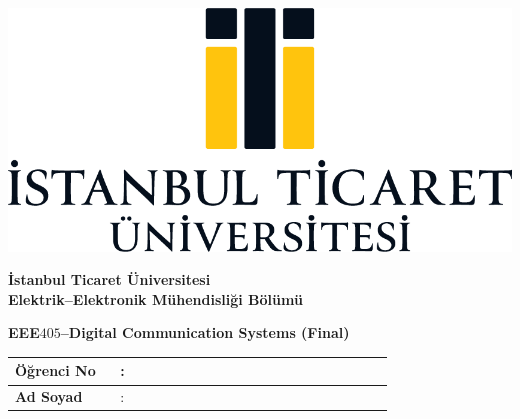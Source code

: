 \documentclass[a4paper, 11pt]{article}
\begin{document}
	\boldmath
	\thispagestyle{empty}
	\begin{minipage}[c]{\textwidth}
		\begin{minipage}[c]{0.3\textwidth}
			\centering
			\includegraphics[width=\textwidth]{logo.png}
		\end{minipage}%
		\begin{minipage}[c]{0.7\textwidth}
			\centering
			{\LARGE \textbf{İstanbul Ticaret Üniversitesi}}\\[1em]
			{\Large \textbf{Elektrik--Elektronik Mühendisliği Bölümü}}
		\end{minipage}
	\end{minipage}
	
	\begin{center}
		\Large
		\textbf{EEE$405$--Digital Communication Systems (Final)}
	\end{center}
	
	\begin{table}[!ht]
		\renewcommand{\arraystretch}{2}
		\centering
		\begin{tabular}{@{}|L{0.25\linewidth} C{0.05\linewidth} p{0.60\linewidth}|@{}}
			\hline
			\textbf{Öğrenci No}& : & ~ \\ \hline
			\textbf{Ad Soyad}  & : & ~ \\ \hline
		\end{tabular}
	\end{table}
	
\end{document}
